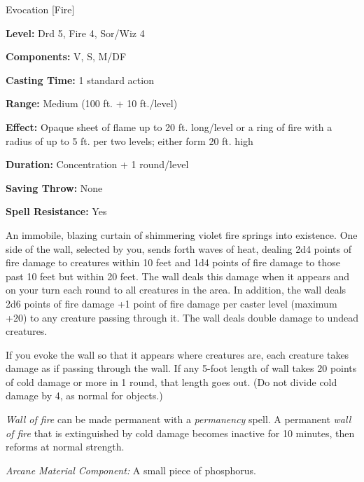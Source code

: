 
Evocation [Fire]

\textbf{Level:} Drd 5, Fire 4, Sor/Wiz 4

\textbf{Components:} V, S, M/DF

\textbf{Casting Time:} 1 standard action

\textbf{Range:} Medium (100 ft. + 10 ft./level)

\textbf{Effect:} Opaque sheet of flame up to 20 ft. long/level or a ring of fire 
with a radius of up to 5 ft. per two levels; either form 20 ft. high

\textbf{Duration:} Concentration + 1 round/level

\textbf{Saving Throw:} None

\textbf{Spell Resistance:} Yes

An immobile, blazing curtain of shimmering violet fire springs into existence. 
One side of the wall, selected by you, sends forth waves of heat, dealing 2d4 points 
of fire damage to creatures within 10 feet and 1d4 points of fire damage to those 
past 10 feet but within 20 feet. The wall deals this damage when it appears and 
on your turn each round to all creatures in the area. In addition, the wall deals 
2d6 points of fire damage +1 point of fire damage per caster level (maximum +20) 
to any creature passing through it. The wall deals double damage to undead creatures.

If you evoke the wall so that it appears where creatures are, each creature takes 
damage as if passing through the wall. If any 5-foot length of wall takes 20 points 
of cold damage or more in 1 round, that length goes out. (Do not divide cold damage 
by 4, as normal for objects.)

\textit{Wall of fire} can be made permanent with a \textit{permanency} spell. A 
permanent \textit{wall of fire} that is extinguished by cold damage becomes inactive 
for 10 minutes, then reforms at normal strength.

\textit{Arcane Material Component:} A small piece of phosphorus.

